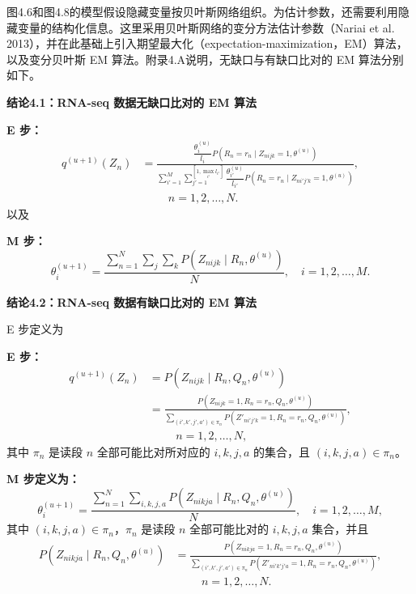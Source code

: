 图4.6和图4.8的模型假设隐藏变量按贝叶斯网络组织。为估计参数，还需要利用隐藏变量的结构化信息。这里采用贝叶斯网络的变分方法估计参数（Nariai et al. 2013），并在此基础上引入期望最大化（expectation-maximization，EM）算法，以及变分贝叶斯 EM 算法。附录4.A说明，无缺口与有缺口比对的 EM 算法分别如下。

\par\medskip{}
\noindent\textbf{结论4.1：RNA-seq 数据无缺口比对的 EM 算法}\par
\noindent\textbf{E 步：}
\begin{equation}
\begin{aligned}
q^{(u+1)}(Z_n)
&=\frac{\dfrac{\theta_i^{(u)}}{l_i}P(R_n=r_n\mid Z_{nijk}=1,\theta^{(u)})}
{\displaystyle\sum_{i'=1}^{M}\sum_{j'=1}^{[1,\max_{i'}l_{i'}]}
\dfrac{\theta_{i'}^{(u)}}{l_{i'}}P(R_n=r_n\mid Z_{ni'j'k}=1,\theta^{(u)})},\\
&\hspace{1cm}n=1,2,\ldots,N.
\end{aligned}
\tag{4.30}
\end{equation}
以及
\par\noindent\textbf{M 步：}
\begin{equation}
\theta_i^{(u+1)}=\frac{\sum_{n=1}^{N}\sum_j\sum_kP(Z_{nijk}\mid R_n,\theta^{(u)})}{N},
\quad i=1,2,\ldots,M.
\tag{4.31}
\end{equation}

\par\medskip{}
\noindent\textbf{结论4.2：RNA-seq 数据有缺口比对的 EM 算法}\par
E 步定义为
\par\noindent\textbf{E 步：}
\begin{equation}
\begin{aligned}
q^{(u+1)}(Z_n)&=P(Z_{nijk}\mid R_n,Q_n,\theta^{(u)})\\
&=\frac{P(Z_{nijk}=1,R_n=r_n,Q_n,\theta^{(u)})}
{\sum_{(i',k',j',a')\in\pi_n}P(Z'_{ni'j'k}=1,R_n=r_n,Q_n,\theta^{(u)})},\\
&\hspace{1cm}n=1,2,\ldots,N,
\end{aligned}
\tag{4.32}
\end{equation}
其中 $\pi_n$ 是读段 $n$ 全部可能比对所对应的 $i,k,j,a$ 的集合，且 $(i,k,j,a)\in\pi_n$。
\par{}\noindent\textbf{M 步定义为：}
\begin{equation}
\theta_i^{(u+1)}=\frac{\sum_{n=1}^{N}\sum_{i,k,j,a}P(Z_{nikja}\mid R_n,Q_n,\theta^{(u)})}{N},
\quad i=1,2,\ldots,M,
\tag{4.33}
\end{equation}
其中 $(i,k,j,a)\in\pi_n$，$\pi_n$ 是读段 $n$ 全部可能比对的 $i,k,j,a$ 集合，并且
\[
\begin{aligned}
P(Z_{nikja}\mid R_n,Q_n,\theta^{(u)})
&=\frac{P(Z_{nikja}=1,R_n=r_n,Q_n,\theta^{(u)})}
{\sum_{(i',k',j',a')\in\pi_n}P(Z'_{ni'k'j'a}=1,R_n=r_n,Q_n,\theta^{(u)})},\\
&\hspace{1cm}n=1,2,\ldots,N.
\end{aligned}
\]

